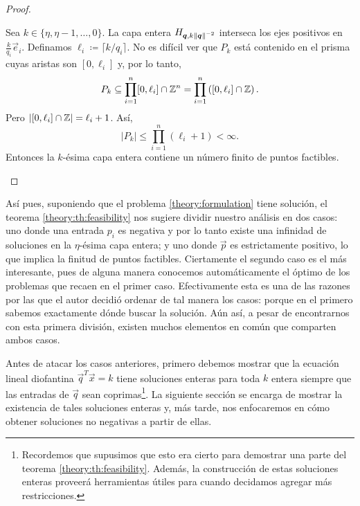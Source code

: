 \begin{proof}
\begin{enumerate}
			Sea $k \in \lbrace \eta, \eta - 1, \ldots, 0 \rbrace$. La capa entera $H_{\boldsymbol{q},
			k\left\lVert \boldsymbol{q} \right\rVert^{-2}}$ interseca los ejes positivos en $\frac{k}{q_i}\vec{e}_i$.
			Definamos $\ell_i \coloneq \lceil k/q_i \rceil$. No es difícil ver que $P_k$ está
			contenido en el prisma cuyas aristas son $[0, \ell_i]$ y, por lo tanto,
			\begin{equation*}
				P_k \subseteq \prod_{i = 1}^{n} [0, \ell_i] \cap \mathbb{Z}^n = \prod_{i = 1}^{n}
				\left( [0, \ell_i] \cap \mathbb{Z} \right).
			\end{equation*}
			Pero $\left| [0, \ell_i] \cap \mathbb{Z} \right| = \ell_i + 1$. Así,
			\begin{equation*}
				|P_k| \leq \prod_{i = 1}^{n} (\ell_i + 1) < \infty.
			\end{equation*}
			Entonces la $k$-ésima capa entera contiene un número finito de puntos factibles.
	\end{enumerate}
\end{proof}

Así pues, suponiendo que el problema \eqref{theory:formulation} tiene solución, el teorema
\ref{theory:th:feasibility} nos sugiere dividir nuestro análisis en dos casos: uno donde una
entrada $p_i$ es negativa y por lo tanto existe una infinidad de soluciones en la $\eta$-ésima
capa entera; y uno donde $\vec{p}$ es estrictamente positivo, lo que implica la finitud de puntos
factibles. Ciertamente el segundo caso es el más interesante, pues de alguna manera conocemos
automáticamente el óptimo de los problemas que recaen en el primer caso. Efectivamente esta es una
de las razones por las que el autor decidió ordenar de tal manera los casos: porque en el primero
sabemos exactamente dónde buscar la solución. Aún así, a pesar de encontrarnos con esta primera
división, existen muchos elementos en común que comparten ambos casos.

Antes de atacar los casos anteriores, primero debemos mostrar que la ecuación lineal diofantina
$\vec{q}^T\vec{x} = k$ tiene soluciones enteras para toda $k$ entera siempre que las entradas de
$\vec{q}$ sean coprimas\footnote{
	Recordemos que supusimos que esto era cierto para demostrar una parte del teorema
	\ref{theory:th:feasibility}. Además, la construcción de estas soluciones enteras proveerá
	herramientas útiles para cuando decidamos agregar más restricciones.
}. La siguiente sección se encarga de mostrar la existencia de tales
soluciones enteras y, más tarde, nos enfocaremos en cómo obtener soluciones no negativas a partir de
ellas.

